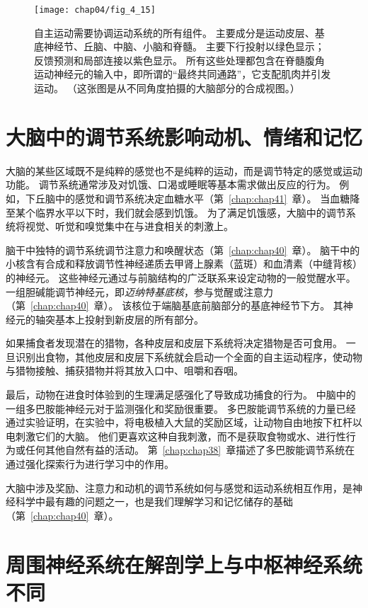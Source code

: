 \begin{figure}[htbp]
	\centering
	\texttt{[image: chap04/fig\_4\_15]}
	\caption{自主运动需要协调运动系统的所有组件。
		主要成分是运动皮层、基底神经节、丘脑、中脑、小脑和脊髓。
		主要下行投射以绿色显示；
		反馈预测和局部连接以紫色显示。
		所有这些处理都包含在脊髓腹角运动神经元的输入中，即所谓的“最终共同通路”，它支配肌肉并引发运动。
		（这张图是从不同角度拍摄的大脑部分的合成视图。）}
	\label{fig:4_15}
\end{figure}



\section{大脑中的调节系统影响动机、情绪和记忆}

大脑的某些区域既不是纯粹的感觉也不是纯粹的运动，而是调节特定的感觉或运动功能。 
调节系统通常涉及对饥饿、口渴或睡眠等基本需求做出反应的行为。 
例如，下丘脑中的感觉和调节系统决定血糖水平（第~\ref{chap:chap41}~章）。 
当血糖降至某个临界水平以下时，我们就会感到饥饿。 
为了满足饥饿感，大脑中的调节系统将视觉、听觉和嗅觉集中在与进食相关的刺激上。


脑干中独特的调节系统调节注意力和唤醒状态（第~\ref{chap:chap40}~章）。 
脑干中的小核含有合成和释放调节性神经递质去甲肾上腺素（蓝斑）和血清素（中缝背核）的神经元。 
这些神经元通过与前脑结构的广泛联系来设定动物的一般觉醒水平。 
一组胆碱能调节神经元，即\textit{迈纳特基底核}，参与觉醒或注意力（第~\ref{chap:chap40}~章）。
该核位于端脑基底前脑部分的基底神经节下方。 
其神经元的轴突基本上投射到新皮层的所有部分。


如果捕食者发现潜在的猎物，各种皮层和皮层下系统将决定猎物是否可食用。 
一旦识别出食物，其他皮层和皮层下系统就会启动一个全面的自主运动程序，使动物与猎物接触、捕获猎物并将其放入口中、咀嚼和吞咽。


最后，动物在进食时体验到的生理满足感强化了导致成功捕食的行为。
中脑中的一组多巴胺能神经元对于监测强化和奖励很重要。 
多巴胺能调节系统的力量已经通过实验证明，在实验中，将电极植入大鼠的奖励区域，让动物自由地按下杠杆以电刺激它们的大脑。 
他们更喜欢这种自我刺激，而不是获取食物或水、进行性行为或任何其他自然有益的活动。 
第~\ref{chap:chap38}~章描述了多巴胺能调节系统在通过强化探索行为进行学习中的作用。


大脑中涉及奖励、注意力和动机的调节系统如何与感觉和运动系统相互作用，是神经科学中最有趣的问题之一，也是我们理解学习和记忆储存的基础（第~\ref{chap:chap40}~章）。



\section{周围神经系统在解剖学上与中枢神经系统不同}

